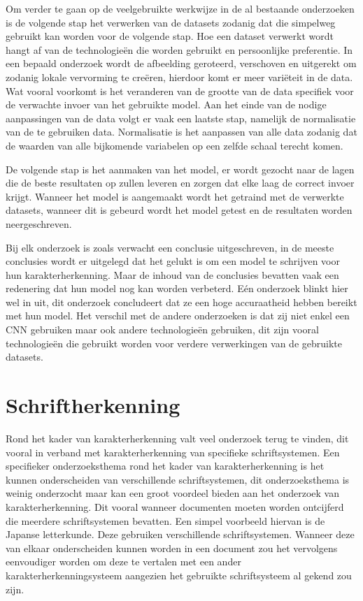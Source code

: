 Om verder te gaan op de veelgebruikte werkwijze in de al bestaande onderzoeken is de volgende stap het verwerken van de datasets zodanig dat die simpelweg gebruikt kan worden voor de volgende stap.
Hoe een dataset verwerkt wordt hangt af van de technologieën die worden gebruikt en persoonlijke preferentie.
In een bepaald onderzoek wordt de afbeelding geroteerd, verschoven en uitgerekt om zodanig lokale vervorming te creëren, hierdoor komt er meer variëteit in de data. \autocite{Weixin}
Wat vooral voorkomt is het veranderen van de grootte van de data specifiek voor de verwachte invoer van het gebruikte model. \autocite{Aiquan2012} \autocite{Mahbubar2015}
Aan het einde van de nodige aanpassingen van de data volgt er vaak een laatste stap, namelijk de normalisatie van de te gebruiken data.
Normalisatie is het aanpassen van alle data zodanig dat de waarden van alle bijkomende variabelen op een zelfde schaal terecht komen.

De volgende stap is het aanmaken van het model, er wordt gezocht naar de lagen die de beste resultaten op zullen leveren en zorgen dat elke laag de correct invoer krijgt.
Wanneer het model is aangemaakt wordt het getraind met de verwerkte datasets, wanneer dit is gebeurd wordt het model getest en de resultaten worden neergeschreven.

Bij elk onderzoek is zoals verwacht een conclusie uitgeschreven, in de meeste conclusies wordt er uitgelegd dat het gelukt is om een model te schrijven voor hun karakterherkenning.
Maar de inhoud van de conclusies bevatten vaak een redenering dat hun model nog kan worden verbeterd. \autocite{Ahmed2017}
Eén onderzoek blinkt hier wel in uit, dit onderzoek concludeert dat ze een hoge accuraatheid hebben bereikt met hun model. Het verschil met de andere onderzoeken is dat zij niet enkel een CNN gebruiken maar ook andere technologieën gebruiken, dit zijn vooral technologieën die gebruikt worden voor verdere verwerkingen van de gebruikte datasets. \autocite{Yann}

\section{Schriftherkenning}

Rond het kader van karakterherkenning valt veel onderzoek terug te vinden, dit vooral in verband met karakterherkenning van specifieke schriftsystemen.
Een specifieker onderzoeksthema rond het kader van karakterherkenning is het kunnen onderscheiden van verschillende schriftsystemen, dit onderzoeksthema is weinig onderzocht maar kan een groot voordeel bieden aan het onderzoek van karakterherkenning.
Dit vooral wanneer documenten moeten worden ontcijferd die meerdere schriftsystemen bevatten. Een simpel voorbeeld hiervan is de Japanse letterkunde. Deze gebruiken verschillende schriftsystemen. Wanneer deze van elkaar onderscheiden kunnen worden in een document zou het vervolgens eenvoudiger worden om deze te vertalen met een ander karakterherkenningsysteem aangezien het gebruikte schriftsysteem al gekend zou zijn.

